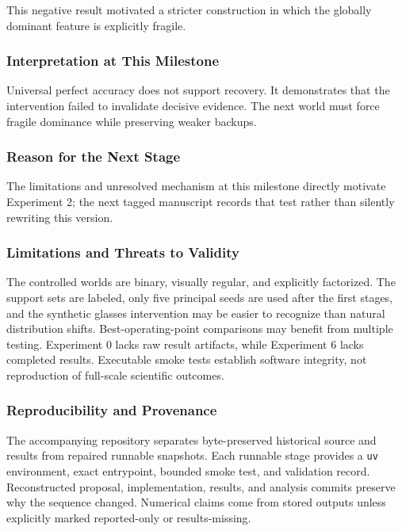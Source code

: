 \documentclass[
  10pt,
]{article}
\begin{document}
This negative result motivated a stricter construction in which the
globally dominant feature is explicitly fragile.

\hypertarget{interpretation-at-this-milestone}{%
\subsubsection{Interpretation at This
Milestone}\label{interpretation-at-this-milestone}}

Universal perfect accuracy does not support recovery. It demonstrates
that the intervention failed to invalidate decisive evidence. The next
world must force fragile dominance while preserving weaker backups.

\hypertarget{reason-for-the-next-stage}{%
\subsubsection{Reason for the Next
Stage}\label{reason-for-the-next-stage}}

The limitations and unresolved mechanism at this milestone directly
motivate Experiment 2; the next tagged manuscript records that test
rather than silently rewriting this version.

\hypertarget{limitations-and-threats-to-validity}{%
\subsubsection{Limitations and Threats to
Validity}\label{limitations-and-threats-to-validity}}

The controlled worlds are binary, visually regular, and explicitly
factorized. The support sets are labeled, only five principal seeds are
used after the first stages, and the synthetic glasses intervention may
be easier to recognize than natural distribution shifts.
Best-operating-point comparisons may benefit from multiple testing.
Experiment 0 lacks raw result artifacts, while Experiment 6 lacks
completed results. Executable smoke tests establish software integrity,
not reproduction of full-scale scientific outcomes.

\hypertarget{reproducibility-and-provenance}{%
\subsubsection{Reproducibility and
Provenance}\label{reproducibility-and-provenance}}

The accompanying repository separates byte-preserved historical source
and results from repaired runnable snapshots. Each runnable stage
provides a \texttt{uv} environment, exact entrypoint, bounded smoke
test, and validation record. Reconstructed proposal, implementation,
results, and analysis commits preserve why the sequence changed.
Numerical claims come from stored outputs unless explicitly marked
reported-only or results-missing.
\end{document}
